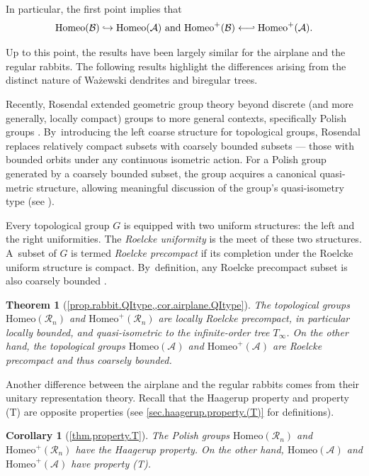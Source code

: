 \documentclass[JEP,XML,SOM,Unicode,NoFloatCountersInSection,published]{cedram}
\newcommand\hto{\mathrel{\lhook\joinrel\to}}
\newcommand\from{\mathchoice{\longleftarrow}{\leftarrow}{\leftarrow}{\leftarrow}}
\newcommand\hfrom{\mathrel{\from\joinrel\rhook}}
\theoremstyle{plain}
\newtheorem{introtheorem}{Theorem}
\newtheorem{introcorollary}{Corollary}
\theoremstyle{definition}
\theoremstyle{remark}
\newcommand{\Homeo}{\mathrm{Homeo}}
\newcommand{\A}{\mathcal{A}}
\newcommand{\B}{\mathcal{B}}
\newcommand{\R}{\mathcal{R}}
\begin{document}
In particular, the first point implies that
\[
\Homeo(\B) \hto \Homeo(\A) \text{ and } \Homeo^+(\B) \hfrom \Homeo^+(\A).
\]

Up to this point, the results have been largely similar for the airplane and the regular rabbits.
The following results highlight the differences arising from the distinct nature of Ważewski dendrites and biregular trees.

Recently, Rosendal extended geometric group theory beyond discrete (and more generally, locally compact) groups to more general contexts, specifically Polish groups \cite{MR4327092}. By~introducing the left coarse structure for topological groups, Rosendal replaces relatively compact subsets with coarsely bounded subsets — those with bounded orbits under any continuous isometric action.
For a Polish group generated by a coarsely bounded subset, the group acquires a canonical quasi-metric structure, allowing meaningful discussion of the group’s quasi-isometry type (see \cite[\S\S 2.8 \& 2.9]{MR4327092}).

Every topological group $G$ is equipped with two uniform structures: the left and the right uniformities.
The \emph{Roelcke uniformity} is the meet of these two structures. A~subset of $G$ is termed \emph{Roelcke precompact} if its completion under the Roelcke uniform structure is compact. By~definition, any Roelcke precompact subset is also coarsely bounded \cite[\S 3.1]{MR4327092}.

\begin{introtheorem}[\cref{prop.rabbit.QItype,,cor.airplane.QItype}]
The topological groups $\Homeo(\R_n)$ and $\Homeo^+(\R_n)$ are locally Roelcke precompact, in particular locally bounded, and quasi-isometric to the infinite-order tree $T_\infty$.
On the other hand, the topological groups $\Homeo(\A)$ and $\Homeo^+(\A)$ are Roelcke precompact and thus coarsely bounded.
\end{introtheorem}

Another difference between the airplane and the regular rabbits comes from their unitary representation theory.
Recall that the Haagerup property and property (T) are opposite properties (see \cref{sec.haagerup.property.(T)} for definitions).

\begin{introcorollary}[\cref{thm.property.T}]
The Polish groups $\Homeo(\R_n)$ and $\Homeo^+(\R_n)$ have the Haagerup property.
On the other hand, $\Homeo(\A)$ and $\Homeo^+(\A)$ have property (T).
\end{introcorollary}
\end{document}
